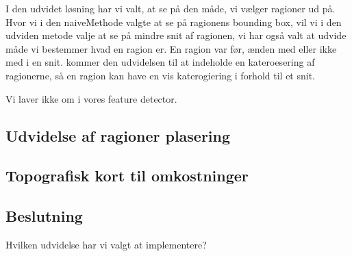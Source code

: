 {
{\sffamily I den udvidet løsning har vi valt, at se på den måde, vi vælger
ragioner ud på. Hvor vi i den naiveMethode valgte at se på ragionens bounding
box, vil vi i den udviden metode valje at se på mindre snit af ragionen, vi har
også valt at udvide måde vi bestemmer hvad en ragion er. En ragion var før,
ænden med eller ikke med i en snit. kommer den udvidelsen til at indeholde en
kateroesering af ragionerne, så en ragion kan have en vis katerogiering i
forhold til et snit.

Vi laver ikke om i vores feature detector.
}

\subsection{Udvidelse af ragioner plasering}


\subsection{Topografisk kort til omkostninger}


\subsection{Beslutning}
Hvilken udvidelse har vi valgt at implementere?

}


